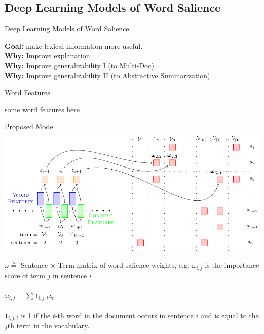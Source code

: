 \subsection{Deep Learning Models of Word Salience}


\begin{frame}{Deep Learning Models of Word Salience}


\textbf{Goal:} make lexical information more useful.\\
\textbf{Why:} Improve explanation.\\
\textbf{Why:} Improve generalizability I (to Multi-Doc)\\
\textbf{Why:} Improve generalizability II (to Abstractive Summarization)

\end{frame}

\begin{frame}{Word Features}

some word features here

\end{frame}

\begin{frame}{Proposed Model}
\includegraphics[scale=.6]{images/section3/4_2_wimp_model.pdf}

    $\omega \triangleq $ Sentence $\times$ Term matrix of word salience 
    weights, e.g. $\omega_{i,j}$ is the importance score of term $j$ 
    in sentence $i$ \\
~\\
$\omega_{i,j} = \sum 1_{i,j,t}  z_t$ \\
~\\
$1_{i,j,t}$ is 1 if the $t$-th word in the document occurs in sentence $i$ and is equal to the $j$th term in the vocabulary.




\end{frame}


